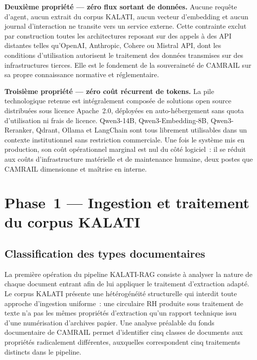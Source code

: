 \documentclass[12pt,a4paper]{report}
\begin{document}
\textbf{Deuxième propriété --- zéro flux sortant de données.} Aucune requête d'agent, aucun
extrait du corpus KALATI, aucun vecteur d'embedding et aucun journal d'interaction ne transite
vers un service externe. Cette contrainte exclut par construction toutes les architectures
reposant sur des appels à des API distantes telles qu'OpenAI, Anthropic, Cohere ou Mistral API,
dont les conditions d'utilisation autorisent le traitement des données transmises sur des
infrastructures tierces. Elle est le fondement de la souveraineté de CAMRAIL sur sa propre
connaissance normative et réglementaire.

\textbf{Troisième propriété --- zéro coût récurrent de tokens.} La pile technologique retenue
est intégralement composée de solutions open source distribuées sous licence Apache~2.0,
déployées en auto-hébergement sans quota d'utilisation ni frais de licence. Qwen3-14B,
Qwen3-Embedding-8B, Qwen3-Reranker, Qdrant, Ollama et LangChain sont tous librement
utilisables dans un contexte institutionnel sans restriction commerciale. Une fois le système
mis en production, son coût opérationnel marginal est nul du côté logiciel~: il se réduit
aux coûts d'infrastructure matérielle et de maintenance humaine, deux postes que CAMRAIL
dimensionne et maîtrise en interne.

\section{Phase~1 --- Ingestion et traitement du corpus KALATI}

\subsection{Classification des types documentaires}

La première opération du pipeline KALATI-RAG consiste à analyser la nature de chaque document
entrant afin de lui appliquer le traitement d'extraction adapté. Le corpus KALATI présente une
hétérogénéité structurelle qui interdit toute approche d'ingestion uniforme~: une circulaire RH
produite sous traitement de texte n'a pas les mêmes propriétés d'extraction qu'un rapport
technique issu d'une numérisation d'archives papier. Une analyse préalable du fonds documentaire
de CAMRAIL permet d'identifier cinq classes de documents aux propriétés radicalement différentes,
auxquelles correspondent cinq traitements distincts dans le pipeline.
\end{document}
